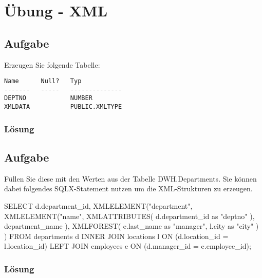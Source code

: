 \section{Übung - XML}
\label{sec:uebung_11}

\subsection{Aufgabe}
\label{sec:uebung_11.aufgabe_01}
Erzeugen Sie folgende Tabelle:

\begin{verbatim}
Name      Null?   Typ
-------   -----   --------------
DEPTNO            NUMBER
XMLDATA           PUBLIC.XMLTYPE
\end{verbatim}

\subsubsection*{Lösung}
\label{sec:uebung_11.aufgabe_01.loesung}


\subsection{Aufgabe}
\label{sec:uebung_11.aufgabe_02}
Füllen Sie diese mit den Werten aus der Tabelle DWH.Departments. Sie können dabei folgendes SQLX-Statement nutzen um die XML-Strukturen zu erzeugen.

\begin{sqlcode}
SELECT
  d.department_id,
  XMLELEMENT("department",
    XMLELEMENT("name",
      XMLATTRIBUTES(
        d.department_id as "deptno"
      ),
      department_name
    ),
    XMLFOREST(
      e.last_name as "manager",
      l.city as "city"
    )
  )
FROM departments d
  INNER JOIN locations l ON (d.location_id = l.location_id)
  LEFT JOIN employees e ON (d.manager_id = e.employee_id);
\end{sqlcode}

\subsubsection*{Lösung}
\label{sec:uebung_11.aufgabe_02.loesung}


